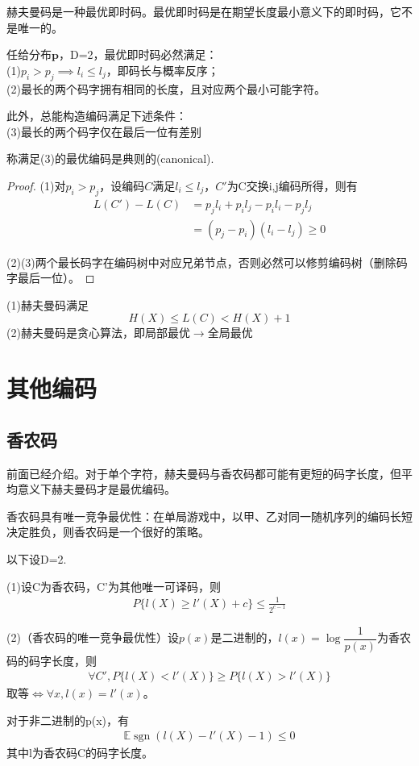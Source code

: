 \documentclass{ctexbook}
\DeclareMathOperator{\sgn}{sgn}          %
\begin{document}
赫夫曼码是一种最优即时码。最优即时码是在期望长度最小意义下的即时码，它不是唯一的。

\begin{lemma}[最优即时码的刻画]
    任给分布$\mathbf{p}$，D=2，最优即时码必然满足：\\
    (1)$p_i>p_j\implies l_i\leq l_j$，即码长与概率反序；\\
    (2)最长的两个码字拥有相同的长度，且对应两个最小可能字符。

    此外，总能构造编码满足下述条件：\\
    (3)最长的两个码字仅在最后一位有差别

    称满足(3)的最优编码是典则的(canonical).
\end{lemma}
\begin{proof}
    (1)对$p_i>p_j$，设编码$C$满足$l_i\leq l_j$，$C'$为C交换i,j编码所得，则有
    \begin{align*}
        L(C')-L(C)&=p_j l_i+p_i l_j-p_i l_i-p_j l_j\\
        &=(p_j-p_i)(l_i-l_j)\geq 0
    \end{align*}

    (2)(3)两个最长码字在编码树中对应兄弟节点，否则必然可以修剪编码树（删除码字最后一位）。
\end{proof}

\begin{remark}
    (1)赫夫曼码满足
    \[H(X)\leq L(C)<H(X)+1\]
    (2)赫夫曼码是贪心算法，即局部最优$\to$全局最优
\end{remark}

\section{其他编码}

\subsection{香农码}

前面已经介绍。对于单个字符，赫夫曼码与香农码都可能有更短的码字长度，但平均意义下赫夫曼码才是最优编码。

香农码具有唯一竞争最优性：在单局游戏中，以甲、乙对同一随机序列的编码长短决定胜负，则香农码是一个很好的策略。

以下设D=2.
\begin{theorem}
    (1)设C为香农码，C'为其他唯一可译码，则
    \begin{align*}
        P\{l(X)\geq l'(X)+c\}\leq\frac{1}{2^{c-1}}
    \end{align*}

    (2)（香农码的唯一竞争最优性）设$p(x)$是二进制的，$l(x)=\log\dfrac{1}{p(x)}$为香农码的码字长度，则
    \begin{align*}
        \forall C',P\{l(X)<l'(X)\}\geq P\{l(X)>l'(X)\}
    \end{align*}
    取等$\iff \forall x,l(x)=l'(x)$。
\end{theorem}
\begin{corollary}
    对于非二进制的p(x)，有\begin{align*}
        \mathbb{E} \sgn(l(X)-l'(X)-1)\leq 0
    \end{align*}
    其中l为香农码C的码字长度。
\end{corollary}
\end{document}
